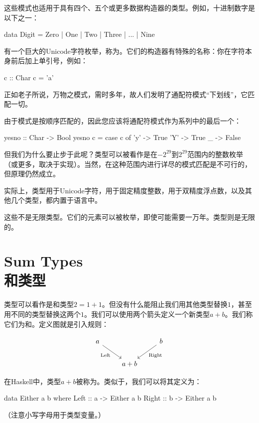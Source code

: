 \documentclass[DaoFP]{subfiles}
\begin{document}
 这些模式也适用于具有四个、五个或更多数据构造器的类型。例如，十进制数字是以下之一：
 \begin{haskell}
  data Digit = Zero | One | Two | Three | ... | Nine
 \end{haskell}

 有一个巨大的Unicode字符枚举，称为。它们的构造器有特殊的名称：你在字符本身前后加上单引号，例如：
 \begin{haskell}
  c :: Char
  c = 'a'
 \end{haskell}

 正如老子所说，万物之模式，需时多年，故人们发明了通配符模式“下划线”，它匹配一切。

 由于模式是按顺序匹配的，因此您应该将通配符模式作为系列中的最后一个：
 \begin{haskell}
  yesno :: Char -> Bool
  yesno c = case c of
  'y' -> True
  'Y' -> True
  _   -> False
 \end{haskell}

 但我们为什么要止步于此呢？类型可以被看作是在$-2^{29}$到$2^{29}$范围内的整数枚举（或更多，取决于实现）。当然，在这种范围内进行详尽的模式匹配是不可行的，但原理仍然成立。

 实际上，类型用于Unicode字符，用于固定精度整数，用于双精度浮点数，以及其他几个类型，都内置于语言中。

 这些不是无限类型。它们的元素可以被枚举，即使可能需要一万年。类型则是无限的。

 \section{Sum Types\\和类型}

 类型可以看作是和类型$2 = 1 + 1$。但没有什么能阻止我们用其他类型替换$1$，甚至用不同的类型替换这两个$1$。我们可以使用两个箭头定义一个新类型$a + b$。我们称它们为和。定义图就是引入规则：

 \[
  \begin{tikzcd}
   a
   \arrow[dr,  "\text{Left}"']
   && b
   \arrow[dl, "\text{Right}"]
   \\
   &a + b
  \end{tikzcd}
 \]

 在Haskell中，类型$a + b$被称为。类似于，我们可以将其定义为：
 \begin{haskell}
  data Either a b where
  Left  :: a -> Either a b
  Right :: b -> Either a b
 \end{haskell}
 （注意小写字母用于类型变量。）
\end{document}
